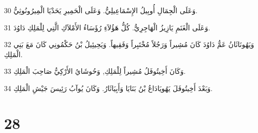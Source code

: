 \par 30 وَعَلَى الْجِمَالِ أُوبِيلُ الإِسْمَاعِيلِيُّ. وَعَلَى الْحَمِيرِ يَحَدْيَا الْمِيرُونُوثِيُّ.
\par 31 وَعَلَى الْغَنَمِ يَازِيزُ الْهَاجِرِيُّ. كُلُّ هَؤُلاَءِ رُؤَسَاءُ الأَمْلاَكِ الَّتِي لِلْمَلِكِ دَاوُدَ.
\par 32 وَيَهُونَاثَانُ عَمُّ دَاوُدَ كَانَ مُشِيراً وَرَجُلاً مُخْتَبِراً وَفَقِيهاً. وَيَحِيئِيلُ بْنُ حَكْمُونِي كَانَ مَعَ بَنِي الْمَلِكِ.
\par 33 وَكَانَ أَخِيتُوفَلُ مُشِيراً لِلْمَلِكِ, وَحُوشَايُ الأَرْكِيُّ صَاحِبَ الْمَلِكِ.
\par 34 وَبَعْدَ أَخِيتُوفَلَ يَهُويَادَاعُ بْنُ بَنَايَا وَأَبِيَاثَارُ. وَكَانَ يُوآبُ رَئِيسَ جَيْشِ الْمَلِكِ.

\chapter{28}

